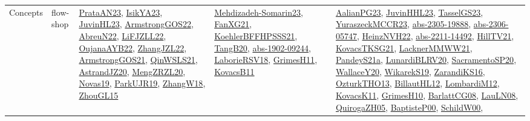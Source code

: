 {\begin{longtable}{lp{3cm}>{\raggedright}p{6cm}>{\raggedright}p{6cm}p{8cm}}
Concepts & flow-shop & \href{articles/PrataAN23.pdf}{PrataAN23}\cite{PrataAN23}, \href{articles/IsikYA23.pdf}{IsikYA23}\cite{IsikYA23}, \href{papers/JuvinHL23.pdf}{JuvinHL23}\cite{JuvinHL23}, \href{papers/ArmstrongGOS22.pdf}{ArmstrongGOS22}\cite{ArmstrongGOS22}, \href{articles/AbreuN22.pdf}{AbreuN22}\cite{AbreuN22}, \href{papers/LiFJZLL22.pdf}{LiFJZLL22}\cite{LiFJZLL22}, \href{papers/OujanaAYB22.pdf}{OujanaAYB22}\cite{OujanaAYB22}, \href{papers/ZhangJZL22.pdf}{ZhangJZL22}\cite{ZhangJZL22}, \href{papers/ArmstrongGOS21.pdf}{ArmstrongGOS21}\cite{ArmstrongGOS21}, \href{articles/QinWSLS21.pdf}{QinWSLS21}\cite{QinWSLS21}, \href{articles/AstrandJZ20.pdf}{AstrandJZ20}\cite{AstrandJZ20}, \href{articles/MengZRZL20.pdf}{MengZRZL20}\cite{MengZRZL20}, \href{articles/Novas19.pdf}{Novas19}\cite{Novas19}, \href{papers/ParkUJR19.pdf}{ParkUJR19}\cite{ParkUJR19}, \href{articles/ZhangW18.pdf}{ZhangW18}\cite{ZhangW18}, \href{papers/ZhouGL15.pdf}{ZhouGL15}\cite{ZhouGL15} & \href{papers/Mehdizadeh-Somarin23.pdf}{Mehdizadeh-Somarin23}\cite{Mehdizadeh-Somarin23}, \href{articles/FanXG21.pdf}{FanXG21}\cite{FanXG21}, \href{articles/KoehlerBFFHPSSS21.pdf}{KoehlerBFFHPSSS21}\cite{KoehlerBFFHPSSS21}, \href{papers/TangB20.pdf}{TangB20}\cite{TangB20}, \href{articles/abs-1902-09244.pdf}{abs-1902-09244}\cite{abs-1902-09244}, \href{articles/LaborieRSV18.pdf}{LaborieRSV18}\cite{LaborieRSV18}, \href{papers/GrimesH11.pdf}{GrimesH11}\cite{GrimesH11}, \href{articles/KovacsB11.pdf}{KovacsB11}\cite{KovacsB11} & \href{papers/AalianPG23.pdf}{AalianPG23}\cite{AalianPG23}, \href{papers/JuvinHHL23.pdf}{JuvinHHL23}\cite{JuvinHHL23}, \href{papers/TasselGS23.pdf}{TasselGS23}\cite{TasselGS23}, \href{articles/YuraszeckMCCR23.pdf}{YuraszeckMCCR23}\cite{YuraszeckMCCR23}, \href{articles/abs-2305-19888.pdf}{abs-2305-19888}\cite{abs-2305-19888}, \href{articles/abs-2306-05747.pdf}{abs-2306-05747}\cite{abs-2306-05747}, \href{articles/HeinzNVH22.pdf}{HeinzNVH22}\cite{HeinzNVH22}, \href{articles/abs-2211-14492.pdf}{abs-2211-14492}\cite{abs-2211-14492}, \href{papers/HillTV21.pdf}{HillTV21}\cite{HillTV21}, \href{papers/KovacsTKSG21.pdf}{KovacsTKSG21}\cite{KovacsTKSG21}, \href{papers/LacknerMMWW21.pdf}{LacknerMMWW21}\cite{LacknerMMWW21}, \href{articles/PandeyS21a.pdf}{PandeyS21a}\cite{PandeyS21a}, \href{articles/LunardiBLRV20.pdf}{LunardiBLRV20}\cite{LunardiBLRV20}, \href{articles/SacramentoSP20.pdf}{SacramentoSP20}\cite{SacramentoSP20}, \href{articles/WallaceY20.pdf}{WallaceY20}\cite{WallaceY20}, \href{articles/WikarekS19.pdf}{WikarekS19}\cite{WikarekS19}, \href{articles/ZarandiKS16.pdf}{ZarandiKS16}\cite{ZarandiKS16}, \href{articles/OzturkTHO13.pdf}{OzturkTHO13}\cite{OzturkTHO13}, \href{papers/BillautHL12.pdf}{BillautHL12}\cite{BillautHL12}, \href{articles/LombardiM12.pdf}{LombardiM12}\cite{LombardiM12}, \href{articles/KovacsK11.pdf}{KovacsK11}\cite{KovacsK11}, \href{papers/GrimesH10.pdf}{GrimesH10}\cite{GrimesH10}, \href{papers/BarlattCG08.pdf}{BarlattCG08}\cite{BarlattCG08}, \href{papers/LauLN08.pdf}{LauLN08}\cite{LauLN08}, \href{papers/QuirogaZH05.pdf}{QuirogaZH05}\cite{QuirogaZH05}, \href{articles/BaptisteP00.pdf}{BaptisteP00}\cite{BaptisteP00}, \href{articles/SchildW00.pdf}{SchildW00}\cite{SchildW00}, 
\end{longtable}}
